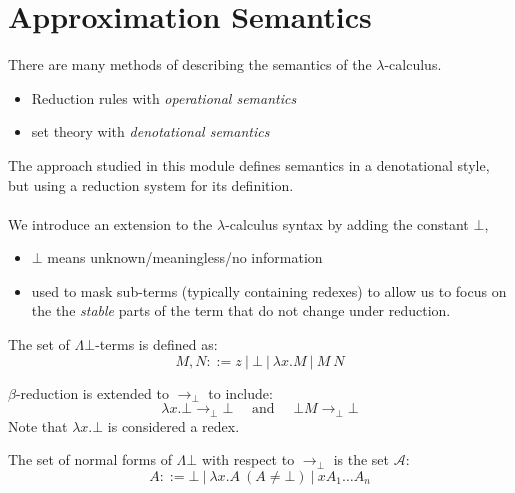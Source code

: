 \section{Approximation Semantics}
There are many methods of describing the semantics of the $\lambda$-calculus.
\begin{itemize}
	\item Reduction rules with \textit{operational semantics}
	\item set theory with \textit{denotational semantics}
\end{itemize}
The approach studied in this module defines semantics in a denotational style, but using a reduction system for its definition.
\\
\\ We introduce an extension to the $\lambda$-calculus syntax by adding the constant $\bot$,
\begin{itemize}
	\item $\bot$ means unknown/meaningless/no information
	\item used to mask sub-terms (typically containing redexes) to allow us to focus on the the \textit{stable} parts of the term that do not change under reduction.
\end{itemize}
The set of $\Lambda\bot$-terms is defined as:
\[M, N ::= z \ | \ \bot \ | \ \lambda x . M \ | \ M \ N\]
\begin{minipage}[t]{.37\textwidth}
	$\beta$-reduction is extended to $\to_\bot$ to include:
	\[\lambda x . \bot \to_\bot \bot \quad \text{ and } \quad \bot M \to_\bot \bot\]
	Note that $\lambda x. \bot$ is considered a redex.
\end{minipage}
\hfill
\vline
\hfill
\begin{minipage}[t]{.6\textwidth}
	The set of normal forms of $\Lambda\bot$ with respect to $\to_\bot$ is the set $\mathcal{A}$:
	\[A ::= \bot \ | \ \lambda x. A \ (A \neq \bot) \ | \ x A_1 \dots A_n\]
\end{minipage}

